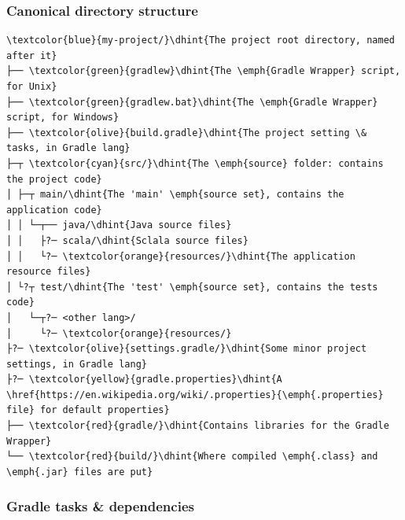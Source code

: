 \documentclass[handout]{beamer}\mode<presentation>{\usetheme{AMSCesenaBleu}}
\begin{document}
\begin{frame}[fragile]
\frametitle{Canonical directory structure}

    
\begin{Verbatim}[commandchars=\\\{\}]
\textcolor{blue}{my-project/}\dhint{The project root directory, named after it}
├── \textcolor{green}{gradlew}\dhint{The \emph{Gradle Wrapper} script, for Unix}
├── \textcolor{green}{gradlew.bat}\dhint{The \emph{Gradle Wrapper} script, for Windows}
├── \textcolor{olive}{build.gradle}\dhint{The project setting \& tasks, in Gradle lang}
├─┬ \textcolor{cyan}{src/}\dhint{The \emph{source} folder: contains the project code}
│ ├─┬ main/\dhint{The 'main' \emph{source set}, contains the application code}
│ │ └─┬── java/\dhint{Java source files}
│ │   ├?─ scala/\dhint{Sclala source files}
│ │   └?─ \textcolor{orange}{resources/}\dhint{The application resource files}
│ └?┬ test/\dhint{The 'test' \emph{source set}, contains the tests code}
│   └─┬?─ <other lang>/
│     └?─ \textcolor{orange}{resources/}
├?─ \textcolor{olive}{settings.gradle/}\dhint{Some minor project settings, in Gradle lang}
├?─ \textcolor{yellow}{gradle.properties}\dhint{A \href{https://en.wikipedia.org/wiki/.properties}{\emph{.properties} file} for default properties}
├── \textcolor{red}{gradle/}\dhint{Contains libraries for the Gradle Wrapper}
└── \textcolor{red}{build/}\dhint{Where compiled \emph{.class} and \emph{.jar} files are put}
\end{Verbatim}

\end{frame}

\subsubsection{Gradle tasks \& dependencies}
\end{document}
